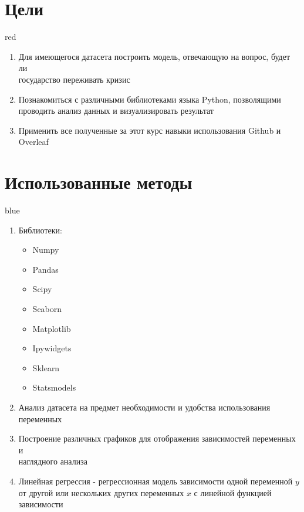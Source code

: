 \documentclass[12pt]{article}
\begin{document}


\tableofcontents
\newpage


\section{\Large Цели}
\begin{mybox}{red}{}
\begin{enumerate}
\item Для имеющегося датасета  построить модель, отвечающую на вопрос, будет ли \\ государство переживать кризис
\item Познакомиться с различными библиотеками языка Python, позволящими проводить анализ данных и визуализировать результат
\item Применить все полученные за этот курс навыки использования Github и  Overleaf  
\end{enumerate}
\end{mybox}


\section{\Large Использованные методы}
\begin{myboxblue}{blue}{}
\begin{enumerate}
\item Библиотеки:

\begin{itemize}
\item Numpy
\item Pandas
\item Scipy
\item Seaborn
\item Matplotlib
\item Ipywidgets
\item Sklearn
\item Statsmodels
\end{itemize}

\item Анализ датасета на предмет необходимости и удобства использования переменных 
\item Построение различных графиков для отображения зависимостей переменных и \\ наглядного анализа 
\item Линейная регрессия - регрессионная модель зависимости одной переменной $y$ от другой или нескольких других переменных $x$ с линейной функцией зависимости
\end{enumerate}
\end{myboxblue}
\newpage
\end{document}
